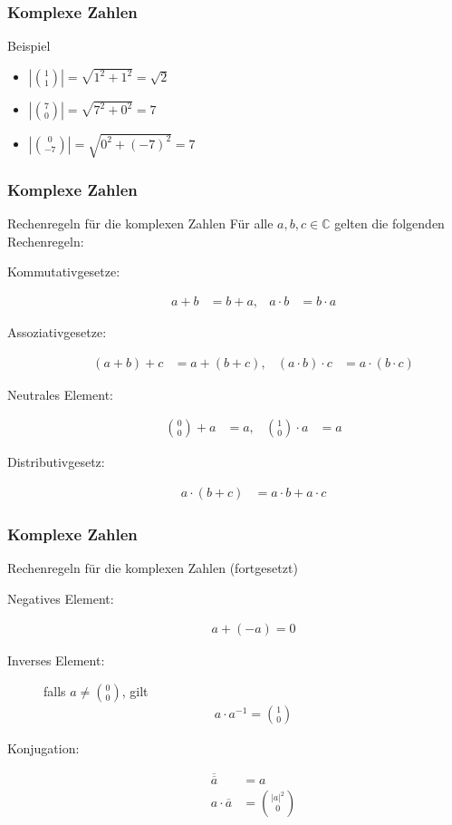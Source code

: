 \documentclass{beamer}
\newcommand\CC{\mathbb C}
\newcommand{\abs}[1]{\left|#1\right|}
\newcommand{\ue}{\"u}
\newcommand{\mytitle}{Komplexe Zahlen}
\begin{document}
\begin{frame}\frametitle{\mytitle}
	\begin{block}{Beispiel}
		\begin{itemize}
			\item $\abs{\binom11}=\sqrt{1^2+1^2}=\sqrt2$
			\item $\abs{\binom70}=\sqrt{7^2+0^2}=7$
			\item $\abs{\binom0{-7}}=\sqrt{0^2+(-7)^2}=7$
		\end{itemize}	
	\end{block}
\end{frame}
\begin{frame}\frametitle{\mytitle}
	\begin{block}{Rechenregeln f\ue r die komplexen Zahlen}
		F\ue r alle $a,b,c\in\CC$ gelten die folgenden Rechenregeln:
		\begin{description}
			\item[Kommutativgesetze:] 
					\begin{align*}
						a+b&=b+a,&a\cdot b&=b\cdot a
			\end{align*}
			\item[Assoziativgesetze:]	
				\begin{align*}
					(a+b)+c&=a+(b+c),&(a\cdot b)\cdot c&=a\cdot(b\cdot c)
				\end{align*}
			\item[Neutrales Element:]
				\begin{align*}
					\binom 00+a&=a,&\binom10\cdot a&=a
				\end{align*}
			\item[Distributivgesetz:]
				\begin{align*}
					a\cdot(b+c)&=a\cdot b+a\cdot c
				\end{align*}
		\end{description}
	\end{block}
\end{frame}

\begin{frame}\frametitle{\mytitle}
	\begin{block}{Rechenregeln f\ue r die komplexen Zahlen (fortgesetzt)}
		\begin{description}
			\item[Negatives Element:] 
					\begin{align*}
						a+(-a)=0
			\end{align*}
			\item[Inverses Element:]	
				falls $a\neq\binom00$, gilt
				\begin{align*}
					a\cdot a^{-1}=\binom10
				\end{align*}
			\item[Konjugation:] 
				\begin{align*}
					\overline{\overline a}&=a\\ a\cdot\overline a&=\binom{|a|^2}0
				\end{align*}
		\end{description}
	\end{block}
\end{frame}
\end{document}
